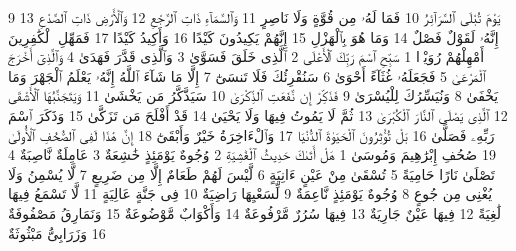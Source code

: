 {\tiny\colorbox{cl_aya}{9}} يَوْمَ تُبْلَى ٱلسَّرَآئِرُ
{\tiny\colorbox{cl_aya}{10}} فَمَا لَهُۥ مِن قُوَّةٍ وَلَا نَاصِرٍ
{\tiny\colorbox{cl_aya}{11}} وَٱلسَّمَآءِ ذَاتِ ٱلرَّجْعِ
{\tiny\colorbox{cl_aya}{12}} وَٱلْأَرْضِ ذَاتِ ٱلصَّدْعِ
{\tiny\colorbox{cl_aya}{13}} إِنَّهُۥ لَقَوْلٌ فَصْلٌ
{\tiny\colorbox{cl_aya}{14}} وَمَا هُوَ بِٱلْهَزْلِ
{\tiny\colorbox{cl_aya}{15}} إِنَّهُمْ يَكِيدُونَ كَيْدًا
{\tiny\colorbox{cl_aya}{16}} وَأَكِيدُ كَيْدًا
{\tiny\colorbox{cl_aya}{17}} فَمَهِّلِ ٱلْكَٰفِرِينَ أَمْهِلْهُمْ رُوَيْدًۢا
{\tiny\colorbox{cl_aya}{1}} سَبِّحِ ٱسْمَ رَبِّكَ ٱلْأَعْلَى
{\tiny\colorbox{cl_aya}{2}} ٱلَّذِى خَلَقَ فَسَوَّىٰ
{\tiny\colorbox{cl_aya}{3}} وَٱلَّذِى قَدَّرَ فَهَدَىٰ
{\tiny\colorbox{cl_aya}{4}} وَٱلَّذِىٓ أَخْرَجَ ٱلْمَرْعَىٰ
{\tiny\colorbox{cl_aya}{5}} فَجَعَلَهُۥ غُثَآءً أَحْوَىٰ
{\tiny\colorbox{cl_aya}{6}} سَنُقْرِئُكَ فَلَا تَنسَىٰٓ
{\tiny\colorbox{cl_aya}{7}} إِلَّا مَا شَآءَ ٱللَّهُ إِنَّهُۥ يَعْلَمُ ٱلْجَهْرَ وَمَا يَخْفَىٰ
{\tiny\colorbox{cl_aya}{8}} وَنُيَسِّرُكَ لِلْيُسْرَىٰ
{\tiny\colorbox{cl_aya}{9}} فَذَكِّرْ إِن نَّفَعَتِ ٱلذِّكْرَىٰ
{\tiny\colorbox{cl_aya}{10}} سَيَذَّكَّرُ مَن يَخْشَىٰ
{\tiny\colorbox{cl_aya}{11}} وَيَتَجَنَّبُهَا ٱلْأَشْقَى
{\tiny\colorbox{cl_aya}{12}} ٱلَّذِى يَصْلَى ٱلنَّارَ ٱلْكُبْرَىٰ
{\tiny\colorbox{cl_aya}{13}} ثُمَّ لَا يَمُوتُ فِيهَا وَلَا يَحْيَىٰ
{\tiny\colorbox{cl_aya}{14}} قَدْ أَفْلَحَ مَن تَزَكَّىٰ
{\tiny\colorbox{cl_aya}{15}} وَذَكَرَ ٱسْمَ رَبِّهِۦ فَصَلَّىٰ
{\tiny\colorbox{cl_aya}{16}} بَلْ تُؤْثِرُونَ ٱلْحَيَوٰةَ ٱلدُّنْيَا
{\tiny\colorbox{cl_aya}{17}} وَٱلْءَاخِرَةُ خَيْرٌ وَأَبْقَىٰٓ
{\tiny\colorbox{cl_aya}{18}} إِنَّ هَٰذَا لَفِى ٱلصُّحُفِ ٱلْأُولَىٰ
{\tiny\colorbox{cl_aya}{19}} صُحُفِ إِبْرَٰهِيمَ وَمُوسَىٰ
{\tiny\colorbox{cl_aya}{1}} هَلْ أَتَىٰكَ حَدِيثُ ٱلْغَٰشِيَةِ
{\tiny\colorbox{cl_aya}{2}} وُجُوهٌ يَوْمَئِذٍ خَٰشِعَةٌ
{\tiny\colorbox{cl_aya}{3}} عَامِلَةٌ نَّاصِبَةٌ
{\tiny\colorbox{cl_aya}{4}} تَصْلَىٰ نَارًا حَامِيَةً
{\tiny\colorbox{cl_aya}{5}} تُسْقَىٰ مِنْ عَيْنٍ ءَانِيَةٍ
{\tiny\colorbox{cl_aya}{6}} لَّيْسَ لَهُمْ طَعَامٌ إِلَّا مِن ضَرِيعٍ
{\tiny\colorbox{cl_aya}{7}} لَّا يُسْمِنُ وَلَا يُغْنِى مِن جُوعٍ
{\tiny\colorbox{cl_aya}{8}} وُجُوهٌ يَوْمَئِذٍ نَّاعِمَةٌ
{\tiny\colorbox{cl_aya}{9}} لِّسَعْيِهَا رَاضِيَةٌ
{\tiny\colorbox{cl_aya}{10}} فِى جَنَّةٍ عَالِيَةٍ
{\tiny\colorbox{cl_aya}{11}} لَّا تَسْمَعُ فِيهَا لَٰغِيَةً
{\tiny\colorbox{cl_aya}{12}} فِيهَا عَيْنٌ جَارِيَةٌ
{\tiny\colorbox{cl_aya}{13}} فِيهَا سُرُرٌ مَّرْفُوعَةٌ
{\tiny\colorbox{cl_aya}{14}} وَأَكْوَابٌ مَّوْضُوعَةٌ
{\tiny\colorbox{cl_aya}{15}} وَنَمَارِقُ مَصْفُوفَةٌ
{\tiny\colorbox{cl_aya}{16}} وَزَرَابِىُّ مَبْثُوثَةٌ
